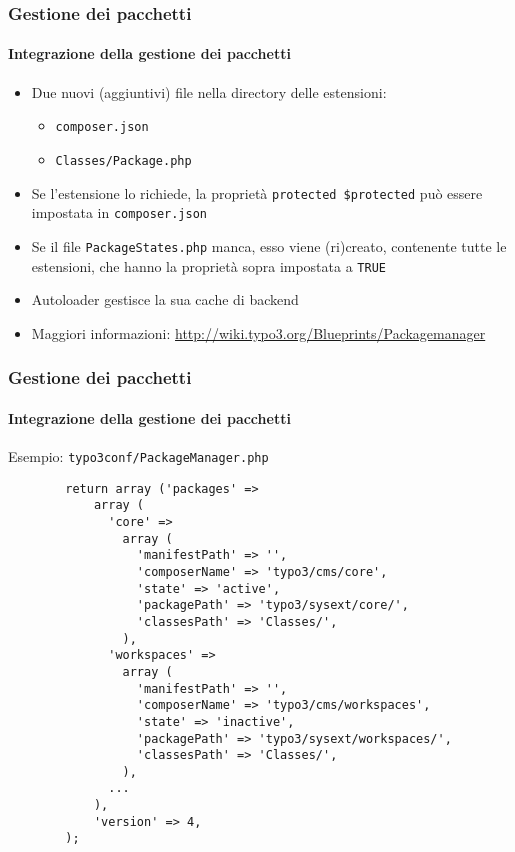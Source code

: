 \begin{frame}[fragile]
	\frametitle{Gestione dei pacchetti}
	\framesubtitle{Integrazione della gestione dei pacchetti}

	\begin{itemize}

		\item Due nuovi (aggiuntivi) file nella directory delle estensioni:

			\begin{itemize}
				\item \texttt{composer.json}
				\item \texttt{Classes/Package.php}
			\end{itemize}

		\item Se l'estensione lo richiede, la proprietà \texttt{protected \$protected}\newline
			può essere impostata in \texttt{composer.json}

		\item Se il file \texttt{PackageStates.php} manca, esso viene (ri)creato,\newline
			contenente tutte le estensioni, che hanno la proprietà sopra impostata a \texttt{TRUE}

		\item Autoloader gestisce la sua cache di backend

		\item Maggiori informazioni:\newline
			\url{http://wiki.typo3.org/Blueprints/Packagemanager}

	\end{itemize}

\end{frame}


\begin{frame}[fragile]
	\frametitle{Gestione dei pacchetti}
	\framesubtitle{Integrazione della gestione dei pacchetti}

	Esempio: \texttt{typo3conf/PackageManager.php}

	\lstset{
		basicstyle=\tiny\ttfamily
	}

	\begin{lstlisting}
		return array ('packages' =>
		    array (
		      'core' =>
		        array (
		          'manifestPath' => '',
		          'composerName' => 'typo3/cms/core',
		          'state' => 'active',
		          'packagePath' => 'typo3/sysext/core/',
		          'classesPath' => 'Classes/',
		        ),
		      'workspaces' =>
		        array (
		          'manifestPath' => '',
		          'composerName' => 'typo3/cms/workspaces',
		          'state' => 'inactive',
		          'packagePath' => 'typo3/sysext/workspaces/',
		          'classesPath' => 'Classes/',
		        ),
		      ...
		    ),
		    'version' => 4,
		);
	\end{lstlisting}

\end{frame}

